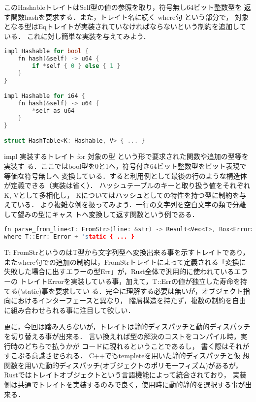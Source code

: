 このHashableトレイトはSelf型の値の参照を取り，符号無し64ビット整数型を
返す関数hashを要求する．また，トレイト名に続く where句 という部分で，
対象となる型はEqトレイトが実装されていなければならないという制約を追加している．
これに対し簡単な実装を与えてみよう．

\begin{lstlisting}[language={C++},caption=トレイトの実装と利用例,label=hash_use]
impl Hashable for bool {
    fn hash(&self) -> u64 {
        if *self { 0 } else { 1 }
    }
}

impl Hashable for i64 {
    fn hash(&self) -> u64 {
        *self as u64
    }
}

struct HashTable<K: Hashable, V> { ... }
\end{lstlisting}

impl 実装するトレイト for 対象の型 という形で要求された関数や追加の型等を実装す
る．ここではbool型を0と1へ，符号付き64ビット整数型をビット表現で等価な符号無しへ
変換している．すると利用例として最後の行のような構造体が定義できる（実装は省く）．
ハッシュテーブルのキーと取り扱う値をそれぞれK, Vとして多相化し，
Kについてはハッシュとしての特性を持つ型に制約を与えている．
より複雑な例を扱ってみよう．一行の文字列を空白文字の類で分離して望みの型にキャス
トへ変換して返す関数という例である．

\begin{lstlisting}[language={C++},caption=トレイトの複合, label=trait_cmpl]
fn parse_from_line<T: FromStr>(line: &str) -> Result<Vec<T>, Box<Error>>
where T::Err: Error + 'static { ... }
\end{lstlisting}

T: FromStrというのはT型から文字列型へ変換出来る事を示すトレイトであり，
またwhere句での追加の制約は，FromStrトレイトによって定義される「変換に
失敗した場合に出すエラーの型Err」が，Rust全体で汎用的に使われているエラーの
トレイトErrorを実装している事，加えて，T::Errの値が独立した寿命を持てる('static)事を要求してい
る．完全に理解する必要は無いが，オブジェクト指向におけるインターフェースと異なり，
階層構造を持たず，複数の制約を自由に組み合わせられる事に注目して欲しい．

更に，今回は踏み入らないが，トレイトは静的ディスパッチと動的ディスパッチを切り替える事が出来る．
言い換えれば型の解決のコストをコンパイル時，実行時のどちらで払うかが
コードに現れるということであるし，
書く際はそれがすこぶる意識させられる．
C++でもtempleteを用いた静的ディスパッチと仮
想関数を用いた動的ディスパッチ(オブジェクトのポリモーフィズム)があるが，
Rustではトレイトオブジェクトという言語機能によって統合されており，
実装側は共通でトレイトを実装するのみで良く，使用時に動的静的を選択する事が出来る．

